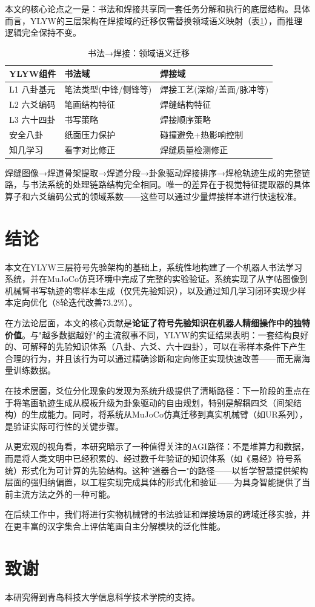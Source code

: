 本文的核心论点之一是：书法和焊接共享同一套任务分解和执行的底层结构。具体而言，YLYW的三层架构在焊接域的迁移仅需替换领域语义映射（表\ref{tab:welding_mapping}），而推理逻辑完全保持不变。

\begin{table}[htbp]
\centering
\caption{书法→焊接：领域语义迁移}
\label{tab:welding_mapping}
\small
\begin{tabular}{p{3cm}p{4cm}p{4cm}}
\toprule
YLYW组件 & 书法域 & 焊接域 \\
\midrule
L1 八卦基元 & 笔法类型(中锋/侧锋等) & 焊接工艺(深熔/盖面/脉冲等) \\
L2 六爻编码 & 笔画结构特征 & 焊缝结构特征 \\
L3 六十四卦 & 书写策略 & 焊接顺序策略 \\
安全八卦 & 纸面压力保护 & 碰撞避免+热影响控制 \\
知几学习 & 看字对比修正 & 焊缝质量检测修正 \\
\bottomrule
\end{tabular}
\end{table}

焊缝图像→焊道骨架提取→焊道分段→卦象驱动焊接排序→焊枪轨迹生成的完整链路，与书法系统的处理链路结构完全相同。唯一的差异在于视觉特征提取器的具体算子和六爻编码公式的领域系数——这些可以通过少量焊接样本进行快速校准。

\section{结论}

本文在YLYW三层符号先验架构的基础上，系统性地构建了一个机器人书法学习系统，并在MuJoCo仿真环境中完成了完整的实验验证。系统实现了从字帖图像到机械臂书写轨迹的零样本生成（仅凭先验知识），以及通过知几学习闭环实现少样本定向优化（8轮迭代改善73.2\%）。

在方法论层面，本文的核心贡献是\textbf{论证了符号先验知识在机器人精细操作中的独特价值}。与"越多数据越好"的主流叙事不同，YLYW的实证结果表明：一套结构良好的、可解释的先验知识体系（八卦、六爻、六十四卦），可以在零样本条件下产生合理的行为，并且该行为可以通过精确诊断和定向修正实现快速改善——而无需海量训练数据。

在技术层面，爻位分化现象的发现为系统升级提供了清晰路径：下一阶段的重点在于将笔画轨迹生成从模板升级为卦象驱动的自由规划，特别是解耦四爻（间架结构）的生成能力。同时，将系统从MuJoCo仿真迁移到真实机械臂（如UR系列），是验证实际可行性的关键步骤。

从更宏观的视角看，本研究暗示了一种值得关注的AGI路径：不是堆算力和数据，而是将人类文明中已经积累的、经过数千年验证的知识体系（如《易经》符号系统）形式化为可计算的先验结构。这种"道器合一"的路径——以哲学智慧提供架构层面的强归纳偏置，以工程实现完成具体的形式化和验证——为具身智能提供了当前主流方法之外的一种可能。

在后续工作中，我们将进行实物机械臂的书法验证和焊接场景的跨域迁移实验，并在更丰富的汉字集合上评估笔画自主分解模块的泛化性能。

\section*{致谢}
本研究得到青岛科技大学信息科学技术学院的支持。



